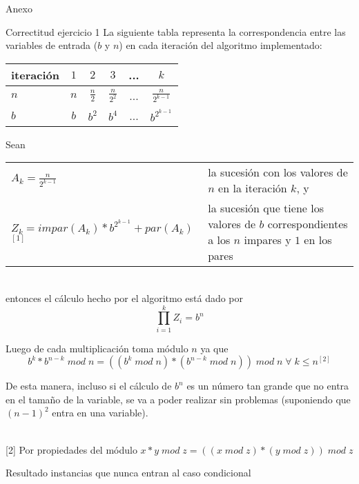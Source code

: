 	\begin{subsection}{Anexo}
		\begin{subsubsection}{Correctitud ejercicio 1}
		La siguiente tabla representa la correspondencia entre las variables de entrada ($b$ y $n$) en 
		cada iteración del algoritmo implementado:

		\vspace{0.5cm}
		\begin{center}
		\begin{tabular}{|l|c|c|c|c|c|}
			\hline
			iteración   & $1$ & $2$           & $3$             & ... & $k$ \\
			\hline
			$n$         & $n$ & $\frac{n}{2}$ & $\frac{n}{2^2}$ & ... & $\frac{n}{2^{k-1}}$ \\
			\hline
			$b$         & $b$ & $b^2$         & $b^4$           & ... & $b^{2^{k-1}}$ \\
			\hline
		\end{tabular}
		\end{center}

		\vspace{0.5cm}
		\noindent Sean \\
		\indent
		\begin{tabular}{lp{6cm}}
			$A_k = \frac{n}{2^{k-1}}$ & la sucesión con los valores de $n$ en la iteración $k$, y \\
			$Z_k = impar(A_k) * b^{2^{k-1}} + par( A_k )$ $^{[1]}$ & la sucesión que tiene los valores de $b$ corres\-pondientes a los $n$ impares y $1$ en los pares
		\end{tabular} \\
		\vspace{0.2cm}
		entonces el cálculo hecho por el algoritmo está dado por 
		$$\displaystyle\prod_{i=1}^k Z_i = b^n$$

		Luego de cada multiplicación toma módulo $n$ ya que
			$$b^k * b^{n-k}\; mod\;n = ((b^k\;mod\;n)*(b^{n-k}\;mod\;n))\;mod\;n\;\forall\;k\leq n ^{[2]}$$ 

		De esta manera, incluso si el cálculo de $b^n$ es un número tan grande que no entra en el 
		tamaño de la variable, se va a poder realizar sin problemas (suponiendo que $(n-1)^2$ entra 
		en una variable).


		\vspace{0.5cm}
		 \\
		\vspace{0.5cm}
		{\footnotesize [2] Por propiedades del módulo $x*y\; mod \; z = ((x\; mod\; z)*(y\; mod\; z))\;mod\; z$ } \\
		\end{subsubsection}
		\begin{subsubsection}{Resultado instancias que nunca entran al caso condicional}
		\end{subsubsection}
	\end{subsection}
